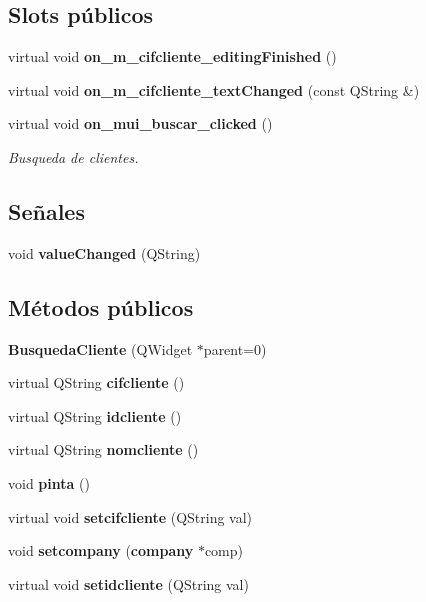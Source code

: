\subsection*{Slots p\'{u}blicos}
\begin{CompactItemize}
\item 
virtual void {\bf on\_\-m\_\-cifcliente\_\-editing\-Finished} ()\label{classBusquedaCliente_i0}

\item 
virtual void {\bf on\_\-m\_\-cifcliente\_\-text\-Changed} (const QString \&)\label{classBusquedaCliente_i1}

\item 
virtual void {\bf on\_\-mui\_\-buscar\_\-clicked} ()\label{classBusquedaCliente_i2}

\begin{CompactList}\small\item\em Busqueda de clientes. \item\end{CompactList}\end{CompactItemize}
\subsection*{Se\~{n}ales}
\begin{CompactItemize}
\item 
void {\bf value\-Changed} (QString)\label{classBusquedaCliente_l0}

\end{CompactItemize}
\subsection*{M\'{e}todos p\'{u}blicos}
\begin{CompactItemize}
\item 
{\bf Busqueda\-Cliente} (QWidget $\ast$parent=0)\label{classBusquedaCliente_a0}

\item 
virtual QString {\bf cifcliente} ()\label{classBusquedaCliente_a1}

\item 
virtual QString {\bf idcliente} ()\label{classBusquedaCliente_a2}

\item 
virtual QString {\bf nomcliente} ()\label{classBusquedaCliente_a3}

\item 
void {\bf pinta} ()\label{classBusquedaCliente_a4}

\item 
virtual void {\bf setcifcliente} (QString val)\label{classBusquedaCliente_a5}

\item 
void {\bf setcompany} ({\bf company} $\ast$comp)\label{classBusquedaCliente_a6}

\item 
virtual void {\bf setidcliente} (QString val)\label{classBusquedaCliente_a7}

\end{CompactItemize}


